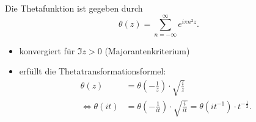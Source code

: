 \begin{frame}

    \begin{definition}
        Die Thetafunktion ist gegeben durch
        \[
            \theta(z) = \sum_{n = -\infty}^{\infty} e^{i\pi n^2z}.
        \]
    \end{definition}
    \begin{itemize}
        \item<2-> konvergiert für $\Im z > 0$ (Majorantenkriterium)
        \item<3-> erfüllt die Thetatransformationsformel: 
        \begin{align*}
            \theta(z) &= \theta\left(-\frac{1}{z}\right)\cdot \sqrt{\frac{i}{z}}\\
            \Leftrightarrow \theta(it) &= \theta\left(-\frac{1}{it}\right) \cdot \sqrt{\frac{i}{it}} = \theta\left(it^{-1}\right)\cdot t^{-\frac{1}{2}}.
        \end{align*}
        \end{itemize}
\end{frame}